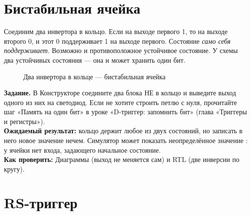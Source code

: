 \section{Бистабильная ячейка}

Соединим два инвертора в кольцо. Если на выходе первого 1, то на выходе
второго 0, и этот 0 поддерживает 1 на выходе первого. Состояние
\emph{само себя поддерживает}. Возможно и противоположное устойчивое
состояние. У схемы два устойчивых состояния --- она  и
может хранить один бит.

\begin{figure}[H]
\centering
{}
\caption{Два инвертора в кольце --- бистабильная ячейка}
\end{figure}

\begin{diybox}
\textbf{Задание.}  В Конструкторе соедините два блока НЕ в кольцо и
выведите выход одного из них на светодиод.  Если не хотите строить
петлю с нуля, прочитайте шаг «Память на один бит» в уроке «D-триггер: запомнить
бит» (глава «Триггеры и регистры»).\\
\textbf{Ожидаемый результат:} кольцо держит любое из двух состояний, но
записать в него новое значение нечем. Симулятор может показать неопределённое
значение : у ячейки нет входа, задающего начальное состояние.\\
\textbf{Как проверить:} Диаграммы (выход не меняется сам) и RTL (две инверсии
по кругу).
\end{diybox}

\section{RS-триггер}

